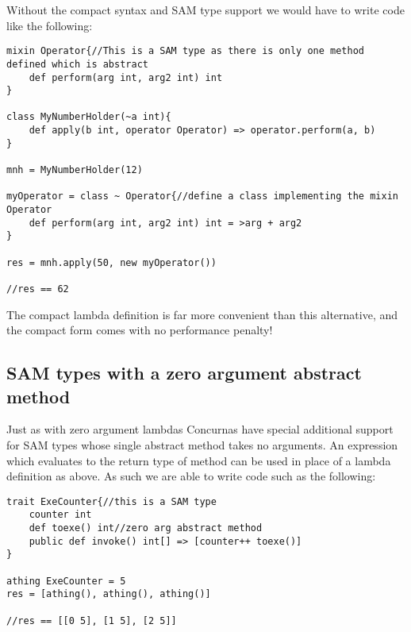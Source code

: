 \documentclass[conc-doc]{subfiles}
\begin{document}
Without the compact syntax and SAM type support we would have to write code like the following:

\begin{lstlisting}
mixin Operator{//This is a SAM type as there is only one method defined which is abstract 
	def perform(arg int, arg2 int) int
}

class MyNumberHolder(~a int){
	def apply(b int, operator Operator) => operator.perform(a, b)
}

mnh = MyNumberHolder(12)

myOperator = class ~ Operator{//define a class implementing the mixin Operator
	def perform(arg int, arg2 int) int = >arg + arg2 
}

res = mnh.apply(50, new myOperator())

//res == 62
\end{lstlisting}

The compact lambda definition is far more convenient than this alternative, and the compact form comes with no performance penalty!

\subsection{SAM types with a zero argument abstract method}
Just as with zero argument lambdas Concurnas have special additional support for SAM types whose single abstract method takes no arguments. An expression which evaluates to the return type of method can be used in place of a lambda definition as above. As such we are able to write code such as the following:

\begin{lstlisting}
trait ExeCounter{//this is a SAM type
	counter int
	def toexe() int//zero arg abstract method
	public def invoke() int[] => [counter++ toexe()]
}

athing ExeCounter = 5
res = [athing(), athing(), athing()]

//res == [[0 5], [1 5], [2 5]]
\end{lstlisting}
\end{document}
